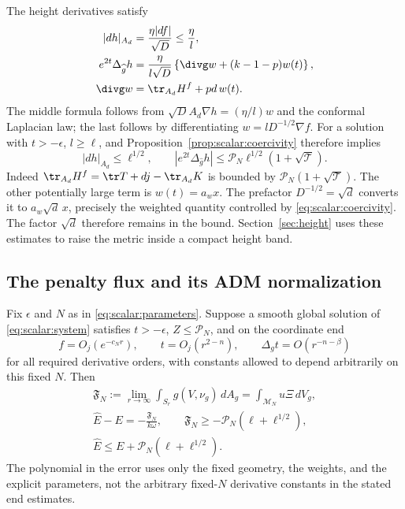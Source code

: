The height derivatives satisfy
\begin{equation}
 \begin{aligned}
 |dh|_{A_d}&=\frac{\eta|df|}{\sqrt D}\leq\frac\eta l,\\
 e^{2t}\Delta_{\widehat g}h
   &=\frac{\eta}{l\sqrt D}
       \left\{\divg w+(k-1-p)w(t)\right\},\\
 \divg w&=\tr_{A_d}H^f+pd\,w(t).
 \end{aligned}
 \label{eq:scalar:height-derivatives}
\end{equation}
The middle formula follows from
$\sqrt D A_d\nabla h=(\eta/l)w$ and the conformal Laplacian law;
the last follows by differentiating $w=lD^{-1/2}\nabla f$.
For a solution with $t>-\epsilon$, $l\geq\ell$, and
Proposition~\ref{prop:scalar:coercivity} therefore implies
\begin{equation}
 |dh|_{A_d}\leq\ell^{1/2},\qquad
 |e^{2t}\Delta_{\widehat g}h|
                  \leq\mathcal P_N\ell^{1/2}(1+\sqrt{\mathcal T}).
 \label{eq:scalar:height-estimates}
\end{equation}
Indeed $\tr_{A_d}H^f=\tr T+dj-\tr_{A_d}K$ is bounded by
$\mathcal P_N(1+\sqrt{\mathcal T})$.  The other potentially large
term is $w(t)=a_wx$.  The prefactor $D^{-1/2}=\sqrt d$ converts it
to $a_w\sqrt d\,x$, precisely the weighted quantity controlled by
\eqref{eq:scalar:coercivity}.  The factor $\sqrt d$ therefore
remains in the bound.  Section~\ref{sec:height} uses these estimates
to raise the
metric inside a compact height band.

\subsection{The penalty flux and its ADM normalization}

\begin{proposition}\label{prop:scalar:flux}
Fix $\epsilon$ and $N$ as in \eqref{eq:scalar:parameters}.
Suppose a smooth global solution
of \eqref{eq:scalar:system} satisfies $t>-\epsilon$,
$Z\leq\mathcal P_N$, and on the coordinate end
\[
 f=O_j(e^{-c_Nr}),\qquad t=O_j(r^{2-n}),\qquad
 \Delta_gt=O(r^{-n-\beta})
\]
for all required derivative orders, with constants allowed to depend
arbitrarily on this fixed $N$.  Then
\begin{equation}
 \begin{gathered}
 \mathfrak F_N:=\lim_{r\to\infty}
       \int_{S_r}g(V,\nu_g)\,dA_g
       =\int_{\mathcal M_N}u\Xi\,dV_g,\\
 \widehat E-E=-\frac{\mathfrak F_N}{k\omega},\qquad
 \mathfrak F_N\geq-\mathcal P_N(\ell+\ell^{1/2}),\\
 \widehat E\leq E+\mathcal P_N(\ell+\ell^{1/2}).
 \end{gathered}
 \label{eq:scalar:flux-energy}
\end{equation}
The polynomial in the error uses only the fixed geometry, the weights,
and the explicit parameters, not the arbitrary fixed-$N$ derivative
constants in the stated end estimates.
\end{proposition}

